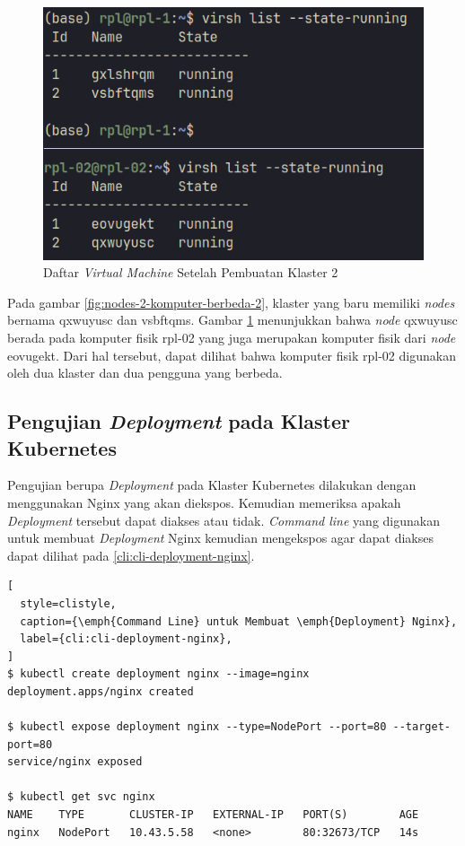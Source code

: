 \begin{figure}[H]
  \centering
  \includegraphics[scale=0.3]{gambar/ssh-nodes-list-2.png}
  \caption{Daftar \emph{Virtual Machine} Setelah Pembuatan Klaster 2}
  \label{fig:vm-komputer-fisik-2}
\end{figure}

Pada gambar \ref{fig:nodes-2-komputer-berbeda-2}, klaster yang baru
memiliki \emph{nodes} bernama qxwuyusc dan vsbftqms. Gambar \ref{fig:vm-komputer-fisik-2}
menunjukkan bahwa \emph{node} qxwuyusc berada pada komputer fisik rpl-02 yang juga
merupakan komputer fisik dari \emph{node} eovugekt. Dari hal tersebut, dapat
dilihat bahwa komputer fisik rpl-02 digunakan oleh dua klaster dan dua pengguna
yang berbeda.

\subsection{Pengujian \emph{Deployment} pada Klaster Kubernetes}
\label{subsec:pengujian-deployment}

Pengujian berupa \emph{Deployment} pada Klaster Kubernetes dilakukan dengan
menggunakan Nginx yang akan diekspos. Kemudian memeriksa apakah \emph{Deployment}
tersebut dapat diakses atau tidak. \emph{Command line} yang digunakan untuk
membuat \emph{Deployment} Nginx kemudian mengekspos agar dapat diakses
dapat dilihat pada \ref{cli:cli-deployment-nginx}.

{\renewcommand{\lstlistingname}{Instruksi Terminal}
\begin{lstlisting}[
  style=clistyle,
  caption={\emph{Command Line} untuk Membuat \emph{Deployment} Nginx},
  label={cli:cli-deployment-nginx},
]
$ kubectl create deployment nginx --image=nginx
deployment.apps/nginx created

$ kubectl expose deployment nginx --type=NodePort --port=80 --target-port=80
service/nginx exposed

$ kubectl get svc nginx
NAME    TYPE       CLUSTER-IP   EXTERNAL-IP   PORT(S)        AGE
nginx   NodePort   10.43.5.58   <none>        80:32673/TCP   14s
\end{lstlisting}
}


